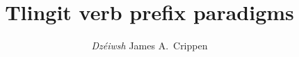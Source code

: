 \documentclass[12pt,letterpaper,landscape,oneside,article]{memoir}
\begin{document}
\pagestyle{mine}

\title{Tlingit verb prefix paradigms}
\author{\textit{Dzéiwsh} James A.\ Crippen}
\maketitle

\begin{KeepFromToc}
\tableofcontents
\end{KeepFromToc}








\end{document}
